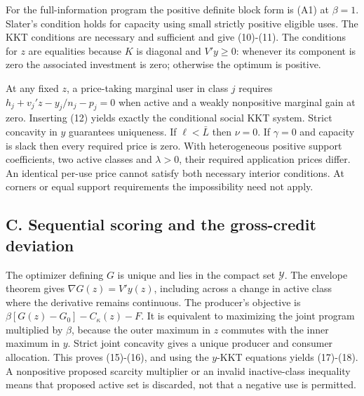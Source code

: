 \documentclass[
  11pt,
]{article}
\begin{document}
For the full-information program the positive definite block form is
(A1) at \(\beta=1\). Slater's condition holds for capacity using small
strictly positive eligible uses. The KKT conditions are necessary and
sufficient and give (10)-(11). The conditions for \(z\) are equalities
because \(K\) is diagonal and \(V'y\geq0\): whenever its component is
zero the associated investment is zero; otherwise the optimum is
positive.

At any fixed \(z\), a price-taking marginal user in class \(j\) requires
\(h_j+v_j'z-y_j/n_j-p_j=0\) when active and a weakly nonpositive
marginal gain at zero. Inserting (12) yields exactly the conditional
social KKT system. Strict concavity in \(y\) guarantees uniqueness. If
\(\ell<\bar L\) then \(\nu=0\). If \(\gamma=0\) and capacity is slack
then every required price is zero. With heterogeneous positive support
coefficients, two active classes and \(\lambda>0\), their required
application prices differ. An identical per-use price cannot satisfy
both necessary interior conditions. At corners or equal support
requirements the impossibility need not apply.

\subsection{C. Sequential scoring and the gross-credit
deviation}\label{c.-sequential-scoring-and-the-gross-credit-deviation}

The optimizer defining \(G\) is unique and lies in the compact set
\(\mathcal Y\). The envelope theorem gives \(\nabla G(z)=V'y(z)\),
including across a change in active class where the derivative remains
continuous. The producer's objective is
\(\beta[G(z)-G_0]-C_\kappa(z)-F\). It is equivalent to maximizing the
joint program multiplied by \(\beta\), because the outer maximum in
\(z\) commutes with the inner maximum in \(y\). Strict joint concavity
gives a unique producer and consumer allocation. This proves (15)-(16),
and using the \(y\)-KKT equations yields (17)-(18). A nonpositive
proposed scarcity multiplier or an invalid inactive-class inequality
means that proposed active set is discarded, not that a negative use is
permitted.
\end{document}
